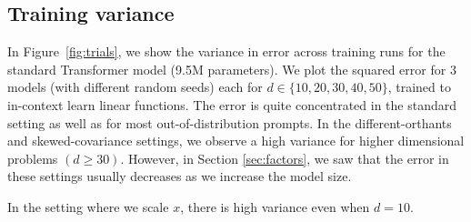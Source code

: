 \documentclass{article}
\begin{document}
\clearpage
\subsection{Training variance}
\label{app:variance}
In Figure~\ref{fig:trials}, we show the variance in error across training runs for the standard Transformer model (9.5M parameters). We plot the squared error for 3 models (with different random seeds) each for $d \in\{10, 20, 30, 40, 50\} $, trained to in-context learn linear functions.
The error is quite concentrated in the standard setting as well as for most out-of-distribution prompts. In the different-orthants and skewed-covariance settings, we observe a high variance for higher dimensional problems $(d \geq 30)$. However, in Section \ref{sec:factors}, we saw that the error in these settings usually decreases as we increase the model size. 

In the setting where we scale $x$, there is high variance even when $d=10$.
\end{document}
